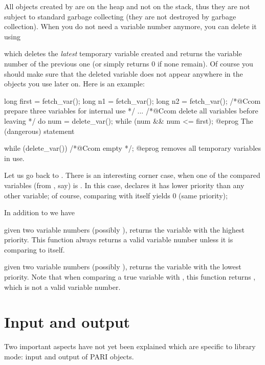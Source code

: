 All objects created by  are on the heap and not on the stack,
thus they are not subject to standard garbage collecting (they are not
destroyed by garbage collection). When you do not need a variable number
anymore, you can delete it using


\noindent which deletes the \emph{latest} temporary variable created and
returns the variable number of the previous one (or simply returns 0 if none
remain). Of course you should make sure that
the deleted variable does not appear anywhere in the objects you use later
on. Here is an example:

\bprog
  long first = fetch_var();
  long n1 = fetch_var();
  long n2 = fetch_var(); /*@Ccom prepare three variables for internal use */
  ...
  /*@Ccom delete all variables before leaving */
  do { num = delete_var(); } while (num && num <= first);
@eprog\noindent
The (dangerous) statement

\bprog
  while (delete_var()) /*@Ccom empty */;
@eprog\noindent
removes all temporary variables in use.


Let us go back to . There is an interesting corner case, when
one of the compared variables (from , say) is .
In this case,  declares it has lower priority than any other
variable; of course, comparing  with itself yields
$0$ (same priority);

In addition to  we have

 given two variable numbers (possibly
), returns the variable with the highest priority.
This function always returns a valid variable number unless it is comparing
 to itself.

 given two variable numbers (possibly
), returns the variable with the lowest priority. Note
that when comparing a true variable with , this function
returns , which is not a valid variable number.

\section{Input and output}

\noindent
Two important aspects have not yet been explained which are specific to
library mode: input and output of PARI objects.

